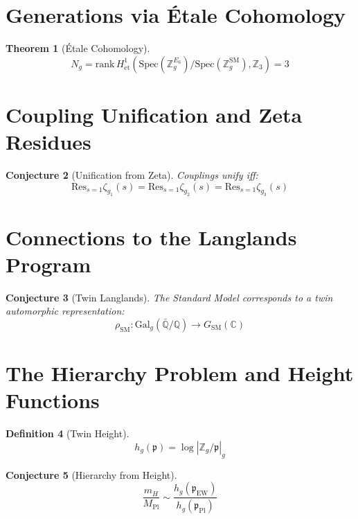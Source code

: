 \documentclass[11pt,a4paper,openright]{book}
\theoremstyle{plain}
\newtheorem{theorem}{Theorem}[chapter]
\newtheorem{conjecture}[theorem]{Conjecture}
\theoremstyle{definition}
\newtheorem{definition}[theorem]{Definition}
\newcommand{\SM}{\mathrm{SM}}
\newcommand{\Pl}{\mathrm{Pl}}
\newcommand{\Gal}{\mathrm{Gal}}
\newcommand{\Spec}{\mathrm{Spec}}
\newcommand{\Res}{\mathrm{Res}}
\newcommand{\C}{\mathbb{C}}
\newcommand{\Z}{\mathbb{Z}}
\newcommand{\Q}{\mathbb{Q}}
\begin{document}
\section{Generations via Étale Cohomology}

\begin{theorem}[Étale Cohomology]
\begin{equation}
N_g = \mathrm{rank}\, H^1_{\mathrm{\acute{e}t}}(\Spec(\Z_g^{E_6})/\Spec(\Z_g^{\SM}), \Z_3) = 3
\end{equation}
\end{theorem}

\section{Coupling Unification and Zeta Residues}

\begin{conjecture}[Unification from Zeta]
Couplings unify iff:
\begin{equation}
\Res_{s=1}\zeta_{g_1}(s) = \Res_{s=1}\zeta_{g_2}(s) = \Res_{s=1}\zeta_{g_3}(s)
\end{equation}
\end{conjecture}

\section{Connections to the Langlands Program}

\begin{conjecture}[Twin Langlands]
The Standard Model corresponds to a twin automorphic representation:
\begin{equation}
\rho_{\SM}: \Gal_g(\bar{\Q}/\Q) \to G_{\SM}(\C)
\end{equation}
\end{conjecture}

\section{The Hierarchy Problem and Height Functions}

\begin{definition}[Twin Height]
\begin{equation}
h_g(\mathfrak{p}) = \log|\Z_g/\mathfrak{p}|_g
\end{equation}
\end{definition}

\begin{conjecture}[Hierarchy from Height]
\begin{equation}
\frac{m_H}{M_{\Pl}} \sim \frac{h_g(\mathfrak{p}_{\mathrm{EW}})}{h_g(\mathfrak{p}_{\Pl})}
\end{equation}
\end{conjecture}
\end{document}
